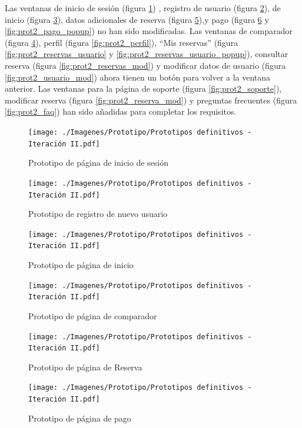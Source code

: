 Las ventanas de inicio de sesión (figura \ref{fig:prot2_ses}) , registro de
usuario (figura \ref{fig:prot2_reg}), de inicio (figura
\ref{fig:prot2_inicio}), datos adicionales de reserva (figura
\ref{fig:prot2_reser}),y pago (figura \ref{fig:prot2_pago} y
\ref{fig:prot2_pago_popup}) no han sido modificadas. Las ventanas de comparador
(figura \ref{fig:prot2_comp}), perfil (figura \ref{fig:prot2_perfil}), ``Mis
reservas'' (figura \ref{fig:prot2_reservas_usuario} y
\ref{fig:prot2_reservas_usuario_popup}), consultar reserva (figura
\ref{fig:prot2_reservas_mod}) y modificar datos de usuario (figura
\ref{fig:prot2_usuario_mod}) ahora tienen un botón para volver a la ventana
anterior. Las ventanas para la página de soporte (figura
\ref{fig:prot2_soporte}), modificar reserva (figura
\ref{fig:prot2_reserva_mod}) y preguntas frecuentes (figura
\ref{fig:prot2_faq}) han sido añadidas para completar los requisitos.
\begin{figure}[H]
      \centering
      \texttt{[image: ./Imagenes/Prototipo/Prototipos definitivos - Iteración II.pdf]}
      \caption{Prototipo de página de inicio de sesión}
      \label{fig:prot2_ses}
\end{figure}

\begin{figure}[H]
      \centering
      \texttt{[image: ./Imagenes/Prototipo/Prototipos definitivos - Iteración II.pdf]}
      \caption{Prototipo de registro de nuevo usuario}
      \label{fig:prot2_reg}
\end{figure}

\begin{figure}[H]
      \centering
      \texttt{[image: ./Imagenes/Prototipo/Prototipos definitivos - Iteración II.pdf]}
      \caption{Prototipo de página de inicio}
      \label{fig:prot2_inicio}
\end{figure}

\begin{figure}[H]
      \centering
      \texttt{[image: ./Imagenes/Prototipo/Prototipos definitivos - Iteración II.pdf]}
      \caption{Prototipo de página de comparador}
      \label{fig:prot2_comp}
\end{figure}

\begin{figure}[H]
      \centering
      \texttt{[image: ./Imagenes/Prototipo/Prototipos definitivos - Iteración II.pdf]}
      \caption{Prototipo de página de Reserva}
      \label{fig:prot2_reser}
\end{figure}

\begin{figure}[H]
      \centering
      \texttt{[image: ./Imagenes/Prototipo/Prototipos definitivos - Iteración II.pdf]}
      \caption{Prototipo de página de pago}
      \label{fig:prot2_pago}
\end{figure}

